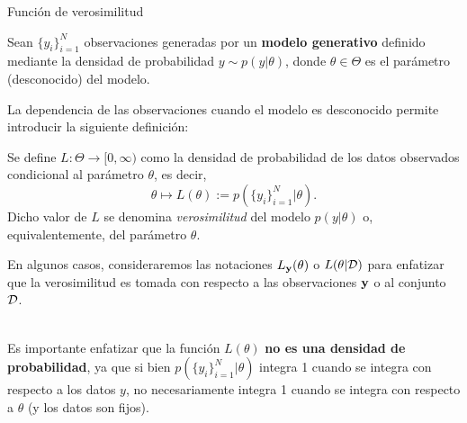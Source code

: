 \documentclass[handout, 9pt]{beamer}
\begin{document}
\begin{frame}{Función de verosimilitud}

Sean $\{y_i\}_{i=1}^N$ observaciones generadas por un \textbf{modelo generativo} definido mediante la densidad de  probabilidad  $y\sim p(y|\theta)$, donde $\theta\in\Theta$ es el parámetro (desconocido) del modelo.\pause
	
La dependencia de las observaciones cuando el modelo es desconocido permite introducir la siguiente definición:

\begin{definition}[verosimilitud]
Se define $L: \Theta \to [0,\infty)$ como la densidad de probabilidad de los datos observados condicional al parámetro $\theta$, es decir, 
\begin{equation*}
			\theta   \mapsto L(\theta) :=  p(\{y_i\}_{i=1}^N | \theta).
\end{equation*}
Dicho valor de $L$ se denomina \emph{verosimilitud} del modelo $p(y|\theta)$ o, equivalentemente, del  parámetro $\theta$. 
\end{definition}\pause

En algunos casos, consideraremos las notaciones $L_{\mathbf{y}}(\theta)$ o $L(\theta|{\mathcal D})$ para enfatizar que la verosimilitud es tomada con respecto a las observaciones  $\mathbf{y}$ o al conjunto ${\mathcal D}$.\\~\ \pause
	
Es importante enfatizar que la función $L(\theta)$ \textbf{no es una densidad de probabilidad}, ya que si bien $p(\{y_i\}_{i=1}^N | \theta)$ integra 1 cuando se integra con respecto a los datos $y$, no necesariamente integra 1 cuando se integra con respecto a $\theta$ (y los datos son fijos).
	
\end{frame}
\end{document}

